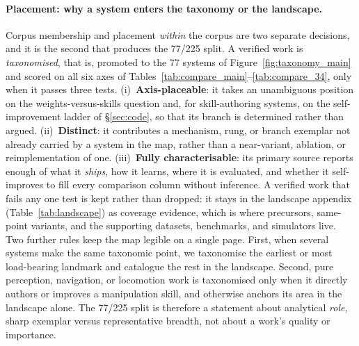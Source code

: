 \documentclass[acmsmall,review,anonymous]{acmart}
\begin{document}
\paragraph{Placement: why a system enters the taxonomy or the landscape.}
Corpus membership and placement \emph{within} the corpus are two separate decisions, and it is the
second that produces the 77/225 split. A verified work is \emph{taxonomised}, that is, promoted to
the 77 systems of Figure~\ref{fig:taxonomy_main} and scored on all six axes of
Tables~\ref{tab:compare_main}--\ref{tab:compare_34}, only when it passes three tests.
(i)~\textbf{Axis-placeable}: it takes an unambiguous position on the weights-versus-skills question
and, for skill-authoring systems, on the self-improvement ladder of \S\ref{sec:code}, so that its
branch is determined rather than argued. (ii)~\textbf{Distinct}: it contributes a mechanism, rung,
or branch exemplar not already carried by a system in the map, rather than a near-variant, ablation,
or reimplementation of one. (iii)~\textbf{Fully characterisable}: its primary source reports enough
of what it \emph{ships}, how it learns, where it is evaluated, and whether it self-improves to fill
every comparison column without inference. A verified work that fails any one test is kept rather
than dropped: it stays in the landscape appendix (Table~\ref{tab:landscape}) as coverage evidence,
which is where precursors, same-point variants, and the supporting datasets, benchmarks, and
simulators live. Two further rules keep the map legible on a single page. First, when several
systems make the same taxonomic point, we taxonomise the earliest or most load-bearing landmark and
catalogue the rest in the landscape. Second, pure perception, navigation, or locomotion work is
taxonomised only when it directly authors or improves a manipulation skill, and otherwise anchors
its area in the landscape alone. The 77/225 split is therefore a statement about analytical
\emph{role}, sharp exemplar versus representative breadth, not about a work's quality or importance.
\end{document}
